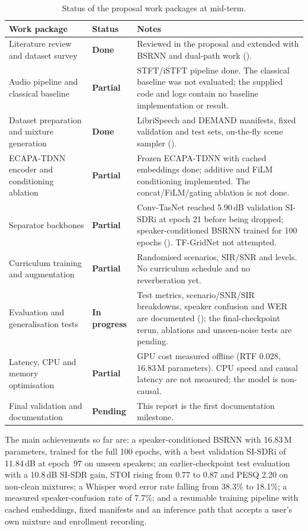 \documentclass[11pt,a4paper]{article}
\newcommand{\sisdr}{SI-SDR}
\newcommand{\sisdri}{SI-SDRi}
\newcommand{\done}{\textbf{Done}}
\newcommand{\partl}{\textbf{Partial}}
\newcommand{\pending}{\textbf{Pending}}
\newcommand{\inprog}{\textbf{In progress}}
\begin{document}
\begin{table}[htbp]
\centering\footnotesize
\caption{Status of the proposal work packages at mid-term.}
\label{tab:progress}
\begin{tabularx}{\textwidth}{@{}>{\raggedright\arraybackslash}p{4.3cm} l Y@{}}
\toprule
\textbf{Work package} & \textbf{Status} & \textbf{Notes}\\
\midrule
Literature review and dataset survey & \done &
  Reviewed in the proposal and extended with BSRNN and dual-path work ().\\
Audio pipeline and classical baseline & \partl &
  STFT/iSTFT pipeline done. The classical baseline was not evaluated; the supplied code and logs
  contain no baseline implementation or result.\\
Dataset preparation and mixture generation & \done &
  LibriSpeech and DEMAND manifests, fixed validation and test sets, on-the-fly scene sampler
  ().\\
ECAPA-TDNN encoder and conditioning ablation & \partl &
  Frozen ECAPA-TDNN with cached embeddings done; additive and FiLM conditioning implemented.
  The concat/FiLM/gating ablation is not done.\\
Separator backbones & \partl &
  Conv-TasNet reached 5.90\,dB validation \sisdri{} at epoch 21 before being dropped;
  speaker-conditioned BSRNN trained for 100 epochs (). TF-GridNet not
  attempted.\\
Curriculum training and augmentation & \partl &
  Randomised scenarios, SIR/SNR and levels. No curriculum schedule and no reverberation yet.\\
Evaluation and generalisation tests & \inprog &
  Test metrics, scenario/SNR/SIR breakdowns, speaker confusion and WER are documented
  (); the final-checkpoint rerun, ablations and unseen-noise tests are pending.\\
Latency, CPU and memory optimisation & \partl &
  GPU cost measured offline (RTF 0.028, 16.83\,M parameters). CPU speed and causal latency are
  not measured; the model is non-causal.\\
Final validation and documentation & \pending &
  This report is the first documentation milestone.\\
\bottomrule
\end{tabularx}
\end{table}

The main achievements so far are: a speaker-conditioned BSRNN with 16.83\,M parameters, trained
for the full 100 epochs, with a best validation \sisdri{} of 11.84\,dB at epoch~97 on unseen
speakers; an earlier-checkpoint test evaluation with a 10.8\,dB \sisdr{} gain, STOI rising from
0.77 to 0.87 and PESQ 2.20 on non-clean mixtures; a Whisper word error rate falling from 38.3\% to
18.1\%; a measured speaker-confusion rate of 7.7\%; and a resumable training pipeline with cached
embeddings, fixed manifests and an inference path that accepts a user's own mixture and enrollment
recording.
\end{document}

